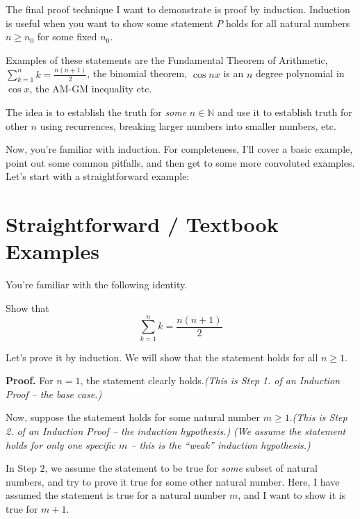 

The final proof technique I want to demonstrate is proof by induction. Induction is useful when you want to show some statement $P$ holds for all natural numbers $n \geq n_0$ for some fixed $n_0$.

Examples of these statements are the Fundamental Theorem of Arithmetic, $\sum _{k=1}^{n} k = \frac {n(n+1)}2$, the binomial theorem, $\cos nx$ is an $n$ degree polynomial in $\cos x$, the $\text{AM-GM}$ inequality etc.

The idea is to establish the truth for \textit{some} $n \in \mathbb N$ and use it to establish truth for other $n$ using recurrences, breaking larger numbers into smaller numbers, etc.

Now, you're familiar with induction. For completeness, I'll cover a basic example, point out some common pitfalls, and then get to some more convoluted examples. Let's start with a straightforward example:

\section*{Straightforward / Textbook Examples}
You're familiar with the following identity.
\begin{SNP}{\prb}Show that$$\sum\limits_{k=1}^{n} k = \dfrac {n(n+1)}2$$
\end{SNP}
Let's prove it by induction. We will show that the statement holds for all $n \geq 1$.
\begin{smrg}\textbf{Proof.} For $n = 1$, the statement clearly holds.\hfill{\footnotesize\itshape(This is Step 1. of an Induction Proof -- the base case.)}

Now, suppose the statement holds for some natural number $m \geq 1$.\hfill{\footnotesize\itshape(This is Step 2. of an Induction Proof -- the induction hypothesis.)}
\hfill{\footnotesize\itshape(We assume the statement holds for only one specific $m$ -- this is the ``weak'' induction hypothesis.)}
\end{smrg}
In Step $2$, we assume the statement to be true for \textit{some} subset of natural numbers, and try to prove it true for some other natural number. Here, I have assumed the statement is true for a natural number $m$, and I want to show it is true for $m + 1$.

